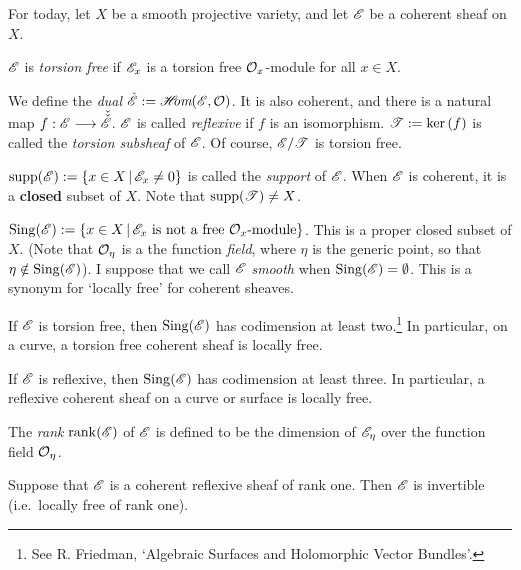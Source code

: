 \documentclass[11pt]{article}
\begin{document}
For today, let $X$ be a smooth projective variety, and let $\mathscr{E}$ be a coherent
sheaf on $X$.
\begin{defn*}
$\mathscr{E}$ is \emph{torsion free} if $\mathscr{E}_x$ is a torsion free $\mathcal{O}_x$-module
for all $x\in X$.
\end{defn*}
\begin{defn*}
We define the \emph{dual} $\check{\mathscr{E}}:=\operatorname{\mathscr{H}\textit{\!\!om}}(\mathscr{E},\mathcal{O})$. It is also
coherent, and there is a natural map $f:\mathscr{E}\longrightarrow\check{\check{\mathscr{E}}}$. $\mathscr{E}$ is
called \emph{reflexive} if $f$ is an isomorphism. $\mathscr{T}:=\textup{ker}\,(f)$ is called the
\emph{torsion subsheaf} of $\mathscr{E}$. Of course, $\mathscr{E}/\mathscr{T}$ is torsion free.
\end{defn*}
\begin{defn*}
$\operatorname{supp}(\mathscr{E}):=\{x\in X\,|\,\mathscr{E}_x\neq0\}$ is called the \emph{support} of
$\mathscr{E}$. When $\mathscr{E}$ is coherent, it is a \textbf{closed} subset of $X$. Note
that $\operatorname{supp}(\mathscr{T})\neq X$.
\end{defn*}
\begin{defn*}
$\operatorname{Sing}(\mathscr{E}):=\{x\in X\,|\, \mathscr{E}_x\text{ is not a free
}\mathcal{O}_x\text{-module}\}$. This is a proper closed subset of $X$. (Note that
$\mathcal{O}_\eta$ is a the function \emph{field}, where $\eta$ is the generic point,
so that $\eta\notin\operatorname{Sing}(\mathscr{E})$). I suppose that we call $\mathscr{E}$ \emph{smooth}
when $\operatorname{Sing}(\mathscr{E})=\emptyset$. This is a synonym for `locally free' for coherent
sheaves.
\end{defn*}
\begin{thm*}
If $\mathscr{E}$ is torsion free, then $\operatorname{Sing}(\mathscr{E})$ has codimension at least
two.\footnote{See R. Friedman, `Algebraic Surfaces and Holomorphic Vector
Bundles'.} In particular, on a curve, a torsion free coherent sheaf is locally
free.
\end{thm*}
\begin{thm*}
If $\mathscr{E}$ is reflexive, then $\operatorname{Sing}(\mathscr{E})$ has codimension at least three. In
particular, a reflexive coherent sheaf on a curve or surface is locally free.
\end{thm*}
\begin{defn*}
The \emph{rank} $\operatorname{rank}(\mathscr{E})$ of $\mathscr{E}$ is defined to be the dimension of
$\mathscr{E}_\eta$ over the function field $\mathcal{O}_\eta$.
\end{defn*}
\begin{thm*}
Suppose that $\mathscr{E}$ is a coherent reflexive sheaf of rank one. Then $\mathscr{E}$ is
invertible (i.e.\ locally free of rank one).
\end{thm*}
\end{document}
